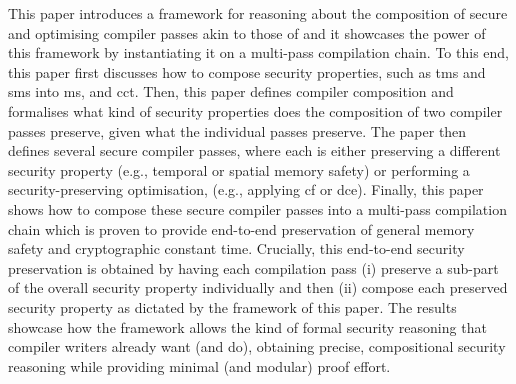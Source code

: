 \documentclass[utf8,acmsmall,review,screen,dvipsnames,anonymous]{acmart}
\begin{document}
This paper introduces a framework for reasoning about the composition of secure and optimising compiler passes akin to those of  and it showcases the power of this framework by instantiating it on a multi-pass compilation chain.
To this end, this paper first discusses how to compose security properties, such as \gls{tms} and \gls{sms} into \gls{ms}, and \gls{cct}.
Then, this paper defines compiler composition and formalises what kind of security properties does the composition of two compiler passes preserve, given what the individual passes preserve.
The paper then defines several secure compiler passes, where each is either preserving a different security property (e.g., temporal or spatial memory safety) or performing a security-preserving optimisation, (e.g., applying \gls{cf} or \gls{dce}).
Finally, this paper shows how to compose these secure compiler passes into a multi-pass compilation chain which is proven to provide end-to-end preservation of general memory safety and cryptographic constant time.
Crucially, this end-to-end security preservation is obtained by having each compilation pass (i) preserve a sub-part of the overall security property individually and then (ii) compose each preserved security property as dictated by the framework of this paper.
The results showcase how the framework allows the kind of formal security reasoning that compiler writers already want (and do), obtaining precise, compositional security reasoning while providing minimal (and modular) proof effort.
\end{document}
